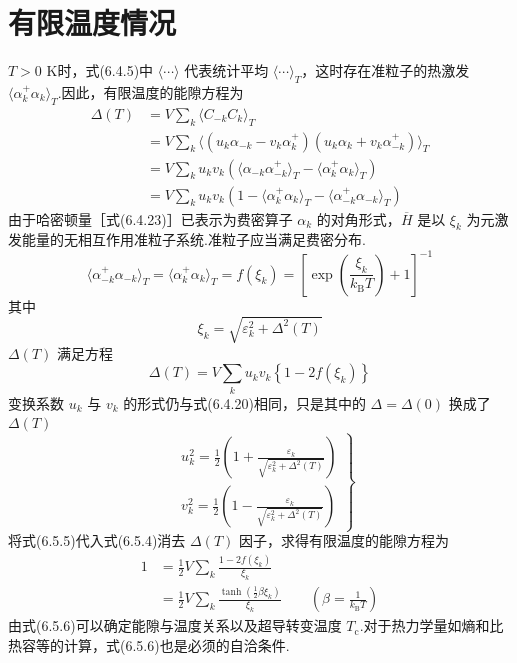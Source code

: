 \section{有限温度情况}

$T>0$ K时，式(6.4.5)中 $\langle\cdots\rangle$ 代表统计平均 $\langle\cdots\rangle_{T}$，这时存在准粒子的热激发 $\langle\alpha^{+}_{k}\alpha_{k}\rangle_{T}$.因此，有限温度的能隙方程为
\begin{equation}
\begin{aligned}
  \Delta(T)&=V\sum_{k}\langle C_{-k}C_{k}\rangle_{T}\\
  &=V\sum_{k}\langle\left(u_{k}\alpha_{-k}-v_{k}\alpha^{+}_{k}\right)
  \left(u_{k}\alpha_{k}+v_{k}\alpha^{+}_{-k}\right)\rangle_{T}\\
  &=V\sum_{k}u_{k}v_{k}\left(\langle\alpha_{-k}\alpha^{+}_{-k}\rangle_{T}
  -\langle\alpha^{+}_{k}\alpha_{k}\rangle_{T}\right)\\
  &=V\sum_{k}u_{k}v_{k}\left(1-\langle\alpha^{+}_{k}\alpha_{k}\rangle_{T}
  -\langle\alpha^{+}_{-k}\alpha_{-k}\rangle_{T}\right)
\end{aligned}
\end{equation}
由于哈密顿量［式(6.4.23)］已表示为费密算子 $\alpha_{k}$ 的对角形式，$\overline{H}$ 是以 $\xi_{k}$ 为元激发能量的无相互作用准粒子系统.准粒子应当满足费密分布.
\begin{equation}
  \langle\alpha^{+}_{-k}\alpha_{-k}\rangle_{T}
  =\langle\alpha^{+}_{k}\alpha_{k}\rangle_{T}=f(\xi_{k})
  =\left[\exp\left(\frac{\xi_{k}}{k_{\mathrm{B}}T}\right)+1\right]^{-1}
\end{equation}
其中
\begin{equation}
  \xi_{k}=\sqrt{\varepsilon_{k}^{2}+\Delta^{2}(T)}
\end{equation}
$\Delta(T)$ 满足方程
\begin{equation}
  \Delta(T)=V\sum_{k}u_{k}v_{k}\left\{1-2f(\xi_{k})\right\}
\end{equation}
变换系数 $u_{k}$ 与 $v_{k}$ 的形式仍与式(6.4.20)相同，只是其中的 $\Delta=\Delta(0)$ 换成了 $\Delta(T)$
\begin{equation}
  \left.
  \begin{aligned}
    &u_{k}^{2}=\frac{1}{2}\left(1+\frac{\varepsilon_{k}}
    {\sqrt{\varepsilon_{k}^{2}+\Delta^{2}(T)}}\right)\\
    &v_{k}^{2}=\frac{1}{2}\left(1-\frac{\varepsilon_{k}}
    {\sqrt{\varepsilon_{k}^{2}+\Delta^{2}(T)}}\right)
  \end{aligned}\right\}
\end{equation}
将式(6.5.5)代入式(6.5.4)消去 $\Delta(T)$ 因子，求得有限温度的能隙方程为
\begin{equation}
\begin{aligned}
  1&=\frac{1}{2}V\sum_{k}\frac{1-2f(\xi_{k})}{\xi_{k}}\\
  &=\frac{1}{2}V\sum_{k}\frac{\tanh\left(\frac{1}{2}\beta\xi_{k}\right)}{\xi_{k}}
  \qquad\left(\beta=\frac{1}{k_{\mathrm{B}}T}\right)
\end{aligned}
\end{equation}
由式(6.5.6)可以确定能隙与温度关系以及超导转变温度 $T_{\mathrm{c}}$.对于热力学量如熵和比热容等的计算，式(6.5.6)也是必须的自洽条件.

